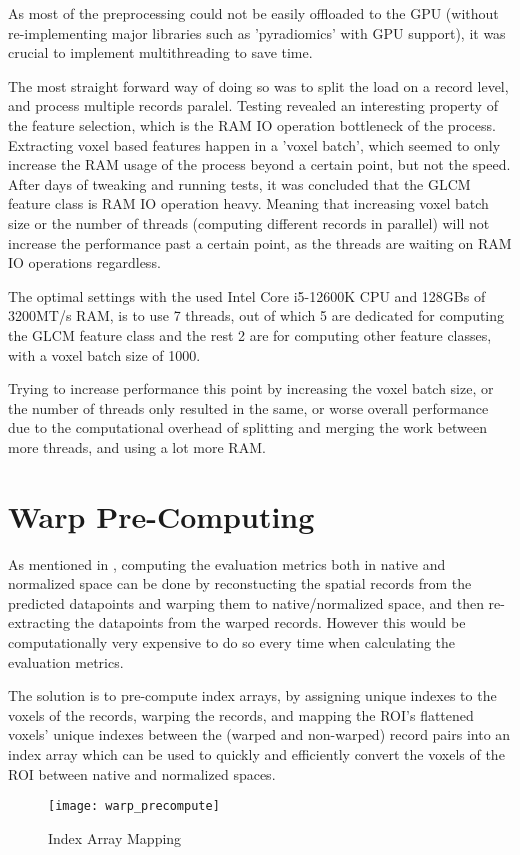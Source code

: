 As most of the preprocessing could not be easily offloaded to the GPU (without re-implementing major libraries such as 'pyradiomics' with GPU support), it was crucial to implement multithreading to save time.\par
The most straight forward way of doing so was to split the load on a record level, and process multiple records paralel. Testing revealed an interesting property of the feature selection, which is the RAM IO operation bottleneck of the process. Extracting voxel based features happen in a 'voxel batch', which seemed to only increase the RAM usage of the process beyond a certain point, but not the speed. After days of tweaking and running tests, it was concluded that the \ac{GLCM} feature class is RAM IO operation heavy. Meaning that increasing voxel batch size or the number of threads (computing different records in parallel) will not increase the performance past a certain point, as the threads are waiting on RAM IO operations regardless.\par
The optimal settings with the used Intel Core i5-12600K CPU and 128GBs of 3200MT/s RAM, is to use 7 threads, out of which 5 are dedicated for computing the \ac{GLCM} feature class and the rest 2 are for computing other feature classes, with a voxel batch size of 1000.\par
Trying to increase performance this point by increasing the voxel batch size, or the number of threads only resulted in the same, or worse overall performance due to the computational overhead of splitting and merging the work between more threads, and using a lot more RAM.

\section{Warp Pre-Computing}

As mentioned in , computing the evaluation metrics both in native and normalized space can be done by reconstucting the spatial records from the predicted datapoints and warping them to native/normalized space, and then re-extracting the datapoints from the warped records. However this would be computationally very expensive to do so every time when calculating the evaluation metrics.\par
The solution is to pre-compute index arrays, by assigning unique indexes to the voxels of the records, warping the records, and mapping the \ac{ROI}'s flattened voxels' unique indexes between the (warped and non-warped) record pairs into an index array which can be used to quickly and efficiently convert the voxels of the \ac{ROI} between native and normalized spaces.

\begin{figure}[H]
\centering
\texttt{[image: warp\_precompute]}
\caption{Index Array Mapping}
\end{figure}













